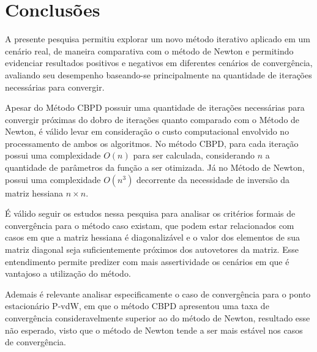 \section{Conclusões}
\label{sec:conclusions}

A presente pesquisa permitiu explorar um novo método iterativo aplicado em um cenário real, de maneira comparativa com o método de Newton e permitindo evidenciar resultados positivos e negativos em diferentes cenários de convergência, avaliando seu desempenho baseando-se principalmente na quantidade de iterações necessárias para convergir.

Apesar do Método CBPD possuir uma quantidade de iterações necessárias para convergir próximas do dobro de iterações quanto comparado com o Método de Newton, é válido levar em consideração o custo computacional envolvido no processamento de ambos os algoritmos. No método CBPD, para cada iteração possui uma complexidade $O(n)$ para ser calculada, considerando $n$ a quantidade de parâmetros da função a ser otimizada. Já no Método de Newton, possui uma complexidade $O(n^3)$ decorrente da necessidade de inversão da matriz hessiana $n \times n$.

É válido seguir os estudos nessa pesquisa para analisar os critérios formais de convergência para o método caso existam, que podem estar relacionados com casos em que a matriz hessiana é diagonalizável e o valor dos elementos de sua matriz diagonal seja suficientemente próximos dos autovetores da matriz. Esse entendimento permite predizer com mais assertividade os cenários em que é vantajoso a utilização do método.

Ademais é relevante analisar especificamente o caso de convergência para o ponto estacionário P-vdW, em que o método CBPD apresentou uma taxa de convergência consideravelmente superior ao do método de Newton, resultado esse não esperado, visto que o método de Newton tende a ser mais estável nos casos de convergência.
